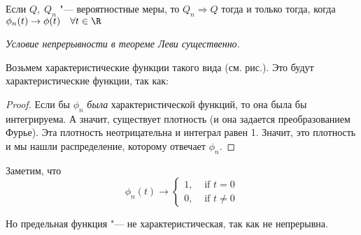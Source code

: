 \documentclass[a4paper,reqno]{amsart}
\begin{document}
\begin{col}
    Если $Q, \;Q_n$  "--- вероятностные меры, то
    $Q_n \Rightarrow Q$ тогда и только тогда, когда $\phi_n(t) \to \phi(t) \quad \forall t \in \R$
\end{col}
\begin{example}
    \emph{Условие непрерывности в теореме Леви существенно.}

Возьмем характеристические функции такого вида (см. рис.). Это будут\\характеристические функции, так как:

    \parbox[b][5cm][t]{0.65\textwidth}{
\begin{proof}
    Если бы $\phi_n$ \emph{была} характеристической функций, то она была бы интегрируема. А значит, существует плотность (и она задается преобразованием Фурье). Эта плотность неотрицательна и интеграл равен 1. Значит, это плотность и мы нашли распределение, которому отвечает $\phi_n$.
\end{proof}
Заметим, что $$\phi_n(t) \to \begin{cases}
    1, &\text{ if }t = 0\\
    0, &\text{ if }t \ne 0
\end{cases}$$
}
\hfill
\parbox[b][5cm][t]{0.3\textwidth}{}
Но предельная функция "--- не характеристическая, так как не непрерывна.
\end{example}
\end{document}
